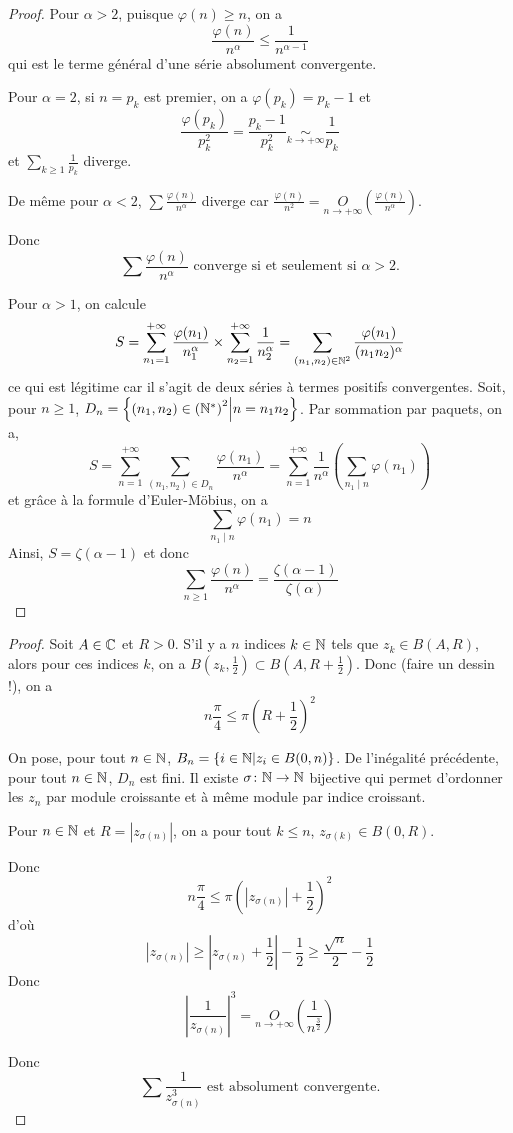\begin{proof}
	Pour $\alpha>2$, puisque $\varphi(n)\geqslant n$, on a 
	$$\frac{\varphi(n)}{n^{\alpha}}\leqslant \frac{1}{n^{\alpha-1}}$$
	qui est le terme général d'une série absolument convergente. 

	Pour $\alpha=2$, si $n=p_{k}$ est premier, on a $\varphi(p_{k})=p_{k}-1$ et 
	$$\frac{\varphi(p_{k})}{p_{k}^{2}}=\frac{p_{k}-1}{p_{k}^{2}}\underset{k\to+\infty}{\sim}\frac{1}{p_{k}}$$
	et $\sum_{k\geqslant1}\frac{1}{p_{k}}$ diverge.

	De même pour $\alpha<2$, $\sum\frac{\varphi(n)}{n^{\alpha}}$ diverge car $\frac{\varphi(n)}{n^{2}}=\underset{n\to+\infty}{O}\left(\frac{\varphi(n)}{n^{\alpha}}\right)$.

	Donc 
	$$\boxed{\sum \frac{\varphi(n)}{n^{\alpha}}\text{ converge si et seulement si }\alpha>2\text{.}}$$

	Pour $\alpha>1$, on calcule 
	$$S=\sum_{n_{1}=1}^{+\infty}\frac{\varphi(n_{1})}{n_{1}^{\alpha}}\times \sum_{n_{2}=1}^{+\infty}\frac{1}{n_{2}^{\alpha}}=\sum_{(n_{1},n_{2})\in\mathbb{N}^{2}}\frac{\varphi(n_{1})}{(n_{1}n_{2})^{\alpha}}$$
	ce qui est légitime car il s'agit de deux séries à termes positifs convergentes. Soit, pour $n\geqslant1$, $D_{n}=\left\{(n_{1},n_{2})\in\left(\mathbb{N}^{*}\right)^{2}\middle| n=n_{1}n_{2}\right\}$. Par sommation par paquets, on a, 
	$$S=\sum_{n=1}^{+\infty}\sum_{(n_{1},n_{2})\in D_{n}}\frac{\varphi(n_{1})}{n^{\alpha}}=\sum_{n=1}^{+\infty}\frac{1}{n^{\alpha}}\left(\sum_{n_{1}\mid n}\varphi(n_{1})\right)$$
	et grâce à la formule d'Euler-Möbius, on a 
	$$\sum_{n_{1}\mid n}\varphi(n_{1})=n$$
	Ainsi, $S=\zeta(\alpha-1)$ et donc 
	$$\boxed{\sum_{n\geqslant1}\frac{\varphi(n)}{n^{\alpha}}=\frac{\zeta(\alpha-1)}{\zeta(\alpha)}}$$
\end{proof}

\begin{proof}
	Soit $A\in \mathbb{C}$ et $R>0$. S'il y a $n$ indices $k\in\mathbb{N}$ tels que $z_{k}\in B(A,R)$, alors pour ces indices $k$, on a $B(z_{k},\frac{1}{2})\subset B(A,R+\frac{1}{2})$. Donc (faire un dessin !), on a 
	$$n\frac{\pi}{4}\leqslant \pi\left(R+\frac{1}{2}\right)^{2}$$

	On pose, pour tout $n\in\mathbb{N}$, $B_{n}=\left\{i\in\mathbb{N}\middle| z_{i}\in B(0,n)\right\}$. De l'inégalité précédente, pour tout $n\in\mathbb{N}$, $D_{n}$ est fini. Il existe $\sigma\colon\mathbb{N}\to\mathbb{N}$ bijective qui permet d'ordonner les $z_{n}$ par module croissante et à même module par indice croissant.

	Pour $n\in\mathbb{N}$ et $R=\left\vert z_{\sigma(n)}\right\vert$, on a pour tout $k\leqslant n$, $z_{\sigma(k)}\in B(0,R)$.

	Donc 
	$$n\frac{\pi}{4}\leqslant\pi\left(\left\vert z_{\sigma(n)}\right\vert+\frac{1}{2}\right)^{2}$$
	d'où 
	$$\left\vert z_{\sigma(n)}\right\vert\geqslant\left\vert z_{\sigma(n)}+\frac{1}{2}\right\vert-\frac{1}{2}\geqslant\frac{\sqrt{n}}{2}-\frac{1}{2}$$
	Donc 
	$$\left\vert\frac{1}{z_{\sigma(n)}}\right\vert^{3}=\underset{n\to+\infty}{O}\left(\frac{1}{n^{\frac{3}{2}}}\right)$$

	Donc
	$$\boxed{\sum \frac{1}{z_{\sigma(n)}^{3}}\text{ est absolument convergente.}}$$
\end{proof}


